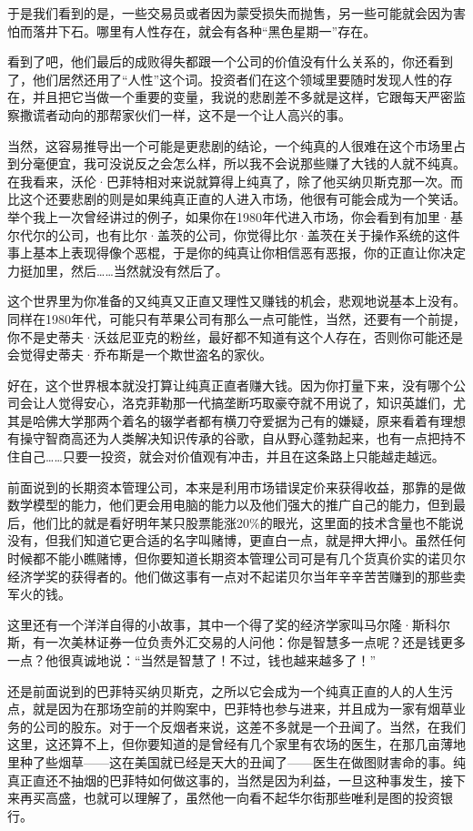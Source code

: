 于是我们看到的是，一些交易员或者因为蒙受损失而抛售，另一些可能就会因为害怕而落井下石。哪里有人性存在，就会有各种``黑色星期一''存在。

看到了吧，他们最后的成败得失都跟一个公司的价值没有什么关系的，你还看到了，他们居然还用了``人性''这个词。投资者们在这个领域里要随时发现人性的存在，并且把它当做一个重要的变量，我说的悲剧差不多就是这样，它跟每天严密监察撒谎者动向的那帮家伙们一样，这不是一个让人高兴的事。

当然，这容易推导出一个可能是更悲剧的结论，一个纯真的人很难在这个市场里占到分毫便宜，我可没说反之会怎么样，所以我不会说那些赚了大钱的人就不纯真。在我看来，沃伦·巴菲特相对来说就算得上纯真了，除了他买纳贝斯克那一次。而比这个还要悲剧的则是如果纯真正直的人进入市场，他很有可能会成为一个笑话。举个我上一次曾经讲过的例子，如果你在1980年代进入市场，你会看到有加里·基尔代尔的公司，也有比尔·盖茨的公司，你觉得比尔·盖茨在关于操作系统的这件事上基本上表现得像个恶棍，于是你的纯真让你相信恶有恶报，你的正直让你决定力挺加里，然后\ldots{}\ldots{}当然就没有然后了。

这个世界里为你准备的又纯真又正直又理性又赚钱的机会，悲观地说基本上没有。同样在1980年代，可能只有苹果公司有那么一点可能性，当然，还要有一个前提，你不是史蒂夫·沃兹尼亚克的粉丝，最好都不知道有这个人存在，否则你可能还是会觉得史蒂夫·乔布斯是一个欺世盗名的家伙。

好在，这个世界根本就没打算让纯真正直者赚大钱。因为你打量下来，没有哪个公司会让人觉得安心，洛克菲勒那一代搞垄断巧取豪夺就不用说了，知识英雄们，尤其是哈佛大学那两个着名的辍学者都有横刀夺爱据为己有的嫌疑，原来看着有理想有操守智商高还为人类解决知识传承的谷歌，自从野心蓬勃起来，也有一点把持不住自己\ldots{}\ldots{}只要一投资，就会对价值观有冲击，并且在这条路上只能越走越远。

前面说到的长期资本管理公司，本来是利用市场错误定价来获得收益，那靠的是做数学模型的能力，他们更会用电脑的能力以及他们强大的推广自己的能力，但到最后，他们比的就是看好明年某只股票能涨20\%的眼光，这里面的技术含量也不能说没有，但我们知道它更合适的名字叫赌博，更直白一点，就是押大押小。虽然任何时候都不能小瞧赌博，但你要知道长期资本管理公司可是有几个货真价实的诺贝尔经济学奖的获得者的。他们做这事有一点对不起诺贝尔当年辛辛苦苦赚到的那些卖军火的钱。

这里还有一个洋洋自得的小故事，其中一个得了奖的经济学家叫马尔隆·斯科尔斯，有一次美林证券一位负责外汇交易的人问他：你是智慧多一点呢？还是钱更多一点？他很真诚地说：``当然是智慧了！不过，钱也越来越多了！''

还是前面说到的巴菲特买纳贝斯克，之所以它会成为一个纯真正直的人的人生污点，就是因为在那场空前的并购案中，巴菲特也参与进来，并且成为一家有烟草业务的公司的股东。对于一个反烟者来说，这差不多就是一个丑闻了。当然，在我们这里，这还算不上，但你要知道的是曾经有几个家里有农场的医生，在那几亩薄地里种了些烟草------这在美国就已经是天大的丑闻了------医生在做图财害命的事。纯真正直还不抽烟的巴菲特如何做这事的，当然是因为利益，一旦这种事发生，接下来再买高盛，也就可以理解了，虽然他一向看不起华尔街那些唯利是图的投资银行。

